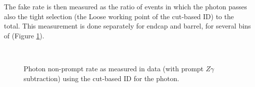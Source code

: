 The fake rate is then measured as the ratio of events in which the photon passes also the tight selection (the Loose working point of the cut-based ID)
to the total.
This measurement is done separately for endcap and barrel, for several bins of \pt (Figure \ref{fig:phFR_VLtoL}).

\begin{figure}
%
\\
%
\caption{Photon non-prompt rate as measured in data (with prompt $Z\gamma$ subtraction) using the cut-based ID for the photon.}
\label{fig:phFR_VLtoL}
\end{figure}

